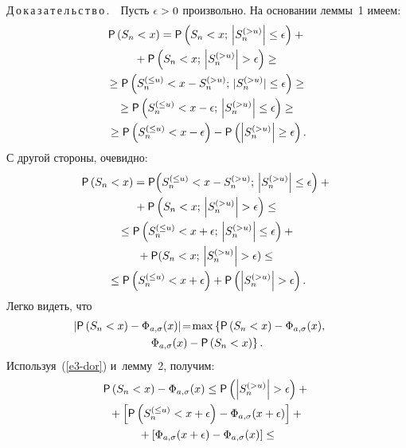 \begin{multicols}{2}
\noindent
Д\,о\,к\,а\,з\,а\,т\,е\,л\,ь\,с\,т\,в\,о\,.\ \
 Пусть $\epsilon\hm>0$ произвольно. На основании леммы~1 имеем:
\begin{multline}
{\sf P}\left(S_n<x\right)={\sf P}\left(S_n<x;\,\left\vert S_n^{(>u)}\right\vert
\le\epsilon\right)+{}\\
{}+{\sf P}\left(S_n<x;\,\left\vert S_n^{(>u)}\right\vert >\epsilon\right)\ge{}
\\
{}\ge{\sf P}\left(S_n^{(\le u)}<x-S_n^{(>u)};\,|S_n^{(>u)}|\le\epsilon\right)\ge{}\\
{}\ge
{\sf P}\left(S_n^{(\le u)}<x-\epsilon;\,\left\vert S_n^{(>u)}\right\vert \le\epsilon\right)\ge
{}\\
{}\ge{\sf P}\left(S_n^{(\le u)}<x-\epsilon\right)-{\sf P}\left(
\left\vert S_n^{(>u)}\right\vert \ge\epsilon\right).
\label{e2-dor}
\end{multline}
С другой стороны, очевидно:
\begin{multline}
{\sf P}\left(S_n<x\right)={\sf P}\!\left(S_n^{(\le u)}<x-S_n^{(>u)};\,\left\vert S_n^{(>u)}\right\vert
\le\epsilon\right)+{}\\
{}+
{\sf P}\left(S_n<x;\,\left\vert S_n^{(>u)}\right\vert >\epsilon\right)\le
{}\\
{}
\le{\sf P}\left(S_n^{(\le u)}<x+\epsilon;\,\left\vert S_n^{(>u)}\right\vert \le\epsilon\right)+{}\\
{}+
{\sf P}(S_n<x;\,\left\vert S_n^{(>u)}\right\vert >\epsilon)\le
{}\\
{}\le{\sf P}\left(S_n^{(\le u)}<x+\epsilon\right)+{\sf P}\left(\left\vert S_n^{(>u)}\right\vert
>\epsilon\right).
\label{e3-dor}
\end{multline}
Легко видеть, что
\begin{multline}
\hspace*{-9.96pt}\left\vert {\sf P}\left(S_n<x\right)-\Phi_{a,\sigma}(x)\right\vert\!=\!
\max\left\{{\sf P}\left(S_n<x\right)-\Phi_{a,\sigma}(x),\right.\\
\left.\Phi_{a,\sigma}(x)-{\sf P}\left(S_n<x\right)\right\}.
\label{e4-dor}
\end{multline}
Используя~(\ref{e3-dor}) и~лемму~2, получим:
\begin{multline}
{\sf P}\left(S_n<x\right)-\Phi_{a,\sigma}(x)\le 
{\sf P}\left(\left\vert S_n^{(>u)}\right\vert>\epsilon\right)+{}\\
{}+
\left[{\sf P}\left(S_n^{(\le u)}<x+\epsilon\right)-\Phi_{a,\sigma}(x+\epsilon)\right]+{}
\\
{}+\left[\Phi_{a,\sigma}(x+\epsilon)-\Phi_{a,\sigma}(x)\right]\le

\end{multline}
\end{multicols}
